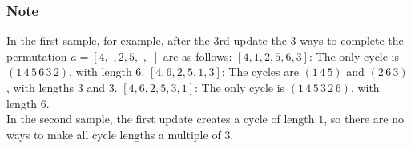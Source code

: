 \documentclass{article}
\begin{document}
\subsubsection*{Note}In the first sample, for example, after the $3$rd update the $3$ ways to complete the permutation $a = [4,\_,2,5,\_,\_]$ are as follows:   $[4,1,2,5,6,3]$: The only cycle is $(1\,4\,5\,6\,3\,2)$, with length $6$.  $[4,6,2,5,1,3]$: The cycles are $(1\,4\,5)$ and $(2\,6\,3)$, with lengths $3$ and $3$.  $[4,6,2,5,3,1]$: The only cycle is $(1\,4\,5\,3\,2\,6)$, with length $6$. \\ In the second sample, the first update creates a cycle of length $1$, so there are no ways to make all cycle lengths a multiple of $3$.
\newpage
\end{document}
